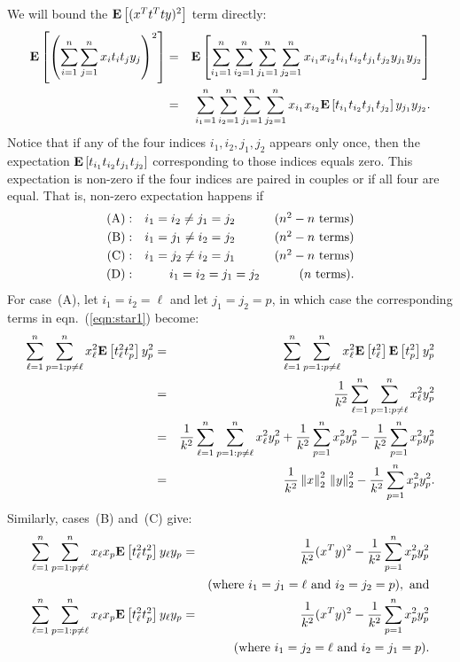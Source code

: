 \documentclass[11pt]{article}
\newcommand{\Expect}[1]{\mbox{}{\bf{E}}\left[#1\right]}
\newcommand{\VTTNormS}[1]{\mbox{}\left\|#1\right\|_2^2}
\begin{document}
We will bound the $\Expect{(x^Tt^Tty)^2}$ term directly:
\begin{eqnarray}
\nonumber
\Expect{\left(\sum_{i=1}^{n}\sum_{j=1}^{n}x_it_it_jy_j\right)^2}
   &=& \Expect{\sum_{i_1=1}^{n}\sum_{i_2=1}^{n}\sum_{j_1=1}^{n}\sum_{j_2=1}^{n}x_{i_1}x_{i_2}t_{i_1}t_{i_2}t_{j_1}t_{j_2}y_{j_1}y_{j_2} } \\
\label{eqn:star1}
   &=& \sum_{i_1=1}^{n}\sum_{i_2=1}^{n}\sum_{j_1=1}^{n}\sum_{j_2=1}^{n}x_{i_1}x_{i_2} \Expect{ t_{i_1}t_{i_2}t_{j_1}t_{j_2} } y_{j_1}y_{j_2}    .
\end{eqnarray}
Notice that if any of the four indices $i_1,i_2,j_1,j_2$ appears only once,
then the expectation $\Expect{ t_{i_1}t_{i_2}t_{j_1}t_{j_2} }$ corresponding
to those indices equals zero.
This expectation is non-zero if the four indices are paired in couples or
if all four are equal.
That is, non-zero expectation happens if
\begin{eqnarray*}
\mbox{(A)} &:& i_1=i_2 \neq j_1=j_2 \hspace{1.0cm} \mbox{ ($n^2-n$ terms)}   \\
\mbox{(B)} &:& i_1=j_1 \neq i_2=j_2 \hspace{1.0cm} \mbox{ ($n^2-n$ terms)}   \\
\mbox{(C)} &:& i_1=j_2 \neq i_2=j_1 \hspace{1.0cm} \mbox{ ($n^2-n$ terms)}   \\
\mbox{(D)} &:& i_1=i_2 =    j_1=j_2 \hspace{1.0cm} \mbox{ ($n$ terms)}   .
\end{eqnarray*}
For case~(A), let $i_1=i_2=\ell$ and let $j_1=j_2=p$, in which case
the corresponding terms in eqn.~(\ref{eqn:star1}) become:
\begin{eqnarray*}
\sum_{\ell=1}^{n}\sum_{p=1:p\ne\ell}^{n} x_{\ell}^2\Expect{t_{\ell}^2t_p^2}y_p^2
   &=& \sum_{\ell=1}^{n}\sum_{p=1:p\ne\ell}^{n} x_{\ell}^2\Expect{t_{\ell}^2}\Expect{t_p^2}y_p^2   \\
   &=& \frac{1}{k^2} \sum_{\ell=1}^{n}\sum_{p=1:p\ne\ell}^{n} x_{\ell}^2y_p^2   \\
   &=& \frac{1}{k^2} \sum_{\ell=1}^{n}\sum_{p=1:p\ne\ell}^{n} x_{\ell}^2y_p^2 + \frac{1}{k^2} \sum_{p=1}^{n} x_p^2y_p^2 - \frac{1}{k^2} \sum_{p=1}^{n}x_p^2y_p^2    \\
   &=& \frac{1}{k^2} \VTTNormS{x} \VTTNormS{y} - \frac{1}{k^2} \sum_{p=1}^n x_p^2 y_p^2    .
\end{eqnarray*}
Similarly, cases~(B) and~(C) give:
\begin{eqnarray*}
\sum_{\ell=1}^{n}\sum_{p=1:p\ne\ell}^{n} x_{\ell}x_p\Expect{t_{\ell}^2t_p^2}y_{\ell}y_p
   &=& \frac{1}{k^2}(x^Ty)^2 - \frac{1}{k^2} \sum_{p=1}^{n} x_p^2 y_p^2   \\
   & & \mbox{(where $i_1 = j_1 = \ell$ and $i_2 = j_2 = p$)}  , \mbox{ and} \\
\sum_{\ell=1}^{n}\sum_{p=1:p\ne\ell}^{n} x_{\ell}x_p\Expect{t_{\ell}^2t_p^2}y_{\ell}y_p
   &=& \frac{1}{k^2}(x^Ty)^2 - \frac{1}{k^2} \sum_{p=1}^{n} x_p^2 y_p^2   \\
   & & \mbox{(where $i_1 = j_2 = \ell$ and $i_2 = j_1 = p$)}          .
\end{eqnarray*}
\end{document}
